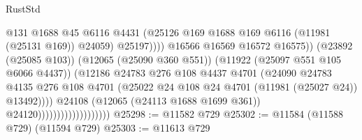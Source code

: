 \begin{lexlean}{RustStd}
\begin{coremodule}
                                                        @131
                                                        @1688
                                                        @45
                                                        @6116
                                                        @4431
                                                        (@25126
                                                          @169
                                                          @1688
                                                          @169
                                                          @6116
                                                          (@11981 (@25131 @169))
                                                          @24059)
                                                        @25197))))
                                                @16566
                                                @16569
                                                @16572
                                                @16575))
                                            (@23892 (@25085 @103))
                                            (@12065 (@25090 @360 @551))
                                            (@11922 (@25097 @551 @105 @6066 @4437))
                                            (@12186
                                              @24783
                                              @276
                                              @108
                                              @4437
                                              @4701
                                              (@24090
                                                @24783
                                                @4135
                                                @276
                                                @108
                                                @4701
                                                (@25022
                                                  @24
                                                  @108
                                                  @24
                                                  @4701
                                                  (@11981 (@25027 @24))
                                                  @13492))))
                                          @24108
                                          (@12065 (@24113 @1688 @1699 @361))
                                          @24120)))))))))))))))))))
@25298 := @11582 @729
@25302 := @11584 (@11588 @729) (@11594 @729)
@25303 := @11613 @729

\end{coremodule}
\end{lexlean}
